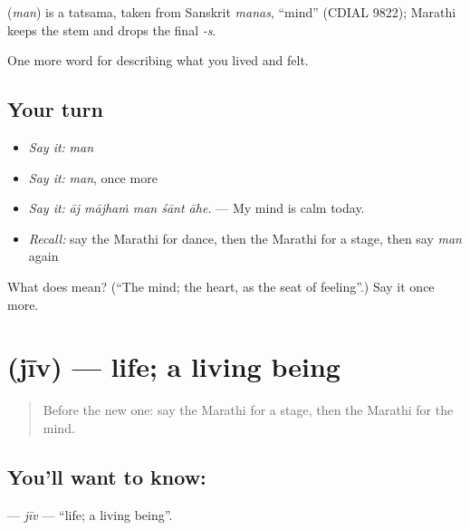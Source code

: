 \begin{cousinweb}
\textbf{} (\emph{man}) is a tatsama, taken from Sanskrit \emph{manas}, \textquotedblleft{}mind\textquotedblright{} (CDIAL 9822); Marathi keeps the stem and drops the final \emph{-s}.
\end{cousinweb}

\begin{grammarlens}[title={What you've built}]
One more word for describing what you lived and felt.
\end{grammarlens}

\subsection*{Your turn}
\begin{itemize}
\raggedright
  \item \emph{Say it:} \emph{man}
  \item \emph{Say it:} \emph{man}, once more
  \item \emph{Say it:} \emph{āj mājhaṁ man śānt āhe.} — My mind is calm today.
  \item \emph{Recall:} say the Marathi for dance, then the Marathi for a stage, then say \emph{man} again
\end{itemize}

\begin{tcolorbox}[breakable,colback=teal!4,colframe=teal!35!black,title={Before you move on}]
What does  mean? (\textquotedblleft{}The mind; the heart, as the seat of feeling\textquotedblright{}.) Say it once more.
\end{tcolorbox}
\section[\texorpdfstring{\mr{जीव} (jīv)}{जीव (jīv)}]{ (jīv) — life; a living being}

\label{lesson:MR-C450-jiv}



\begin{quote}
Before the new one: say the Marathi for a stage, then the Marathi for the mind.
\end{quote}

\subsection*{You'll want to know: }
\textbf{} — \emph{jīv} — \textquotedblleft{}life; a living being\textquotedblright{}.

